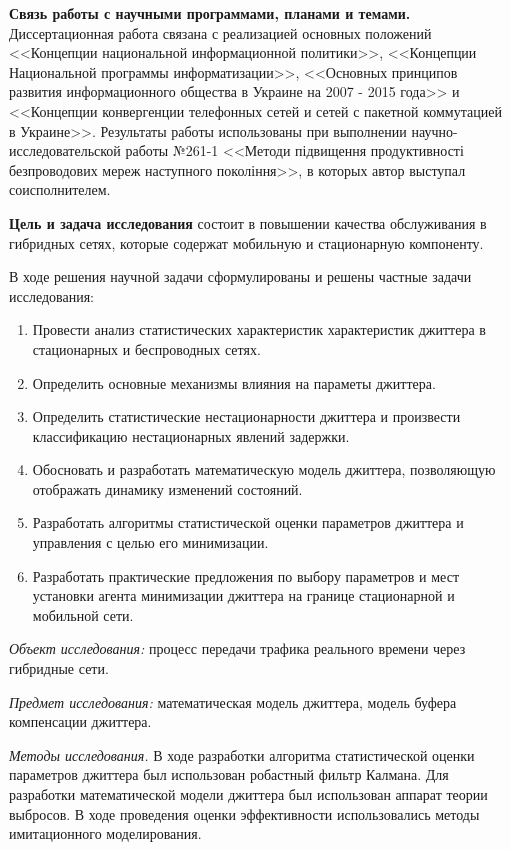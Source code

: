 \textbf{Связь работы с научными программами, планами и темами.} Диссертационная работа связана с реализацией основных положений <<Концепции национальной информационной политики>>, <<Концепции Национальной программы информатизации>>, <<Основных принципов развития информационного общества в Украине на 2007 - 2015 года>> и <<Концепции конвергенции телефонных сетей и сетей с пакетной коммутацией в Украине>>.
Результаты работы использованы при выполнении научно-исследовательской работы №261-1 <<Методи підвищення продуктивності безпроводових мереж наступного покоління>>, в которых автор выступал соисполнителем.

\textbf{Цель и задача исследования} состоит в повышении качества обслуживания в гибридных сетях, которые содержат мобильную и стационарную компоненту.

В ходе решения научной задачи сформулированы и решены частные задачи исследования:
\begin{enumerate}
  \item Провести анализ статистических характеристик характеристик джиттера в стационарных и беспроводных сетях.
  \item Определить основные механизмы влияния на параметы джиттера.
  \item Определить статистические нестационарности джиттера и произвести классификацию нестационарных явлений задержки.
  \item Обосновать и разработать математическую модель джиттера, позволяющую отображать динамику изменений состояний.
  \item Разработать алгоритмы статистической оценки параметров джиттера и управления с целью его минимизации.
  \item Разработать практические предложения по выбору параметров и мест установки агента минимизации джиттера на границе стационарной и мобильной сети.
\end{enumerate}

{\itshape Объект исследования:} процесс передачи трафика реального времени через гибридные сети.

{\itshape Предмет исследования:} математическая модель джиттера, модель буфера компенсации джиттера.

{\itshape Методы исследования.} В ходе разработки алгоритма статистической оценки параметров джиттера был использован робастный фильтр Калмана. Для разработки математической модели джиттера был использован аппарат теории выбросов. В ходе проведения оценки эффективности использовались методы имитационного моделирования.


